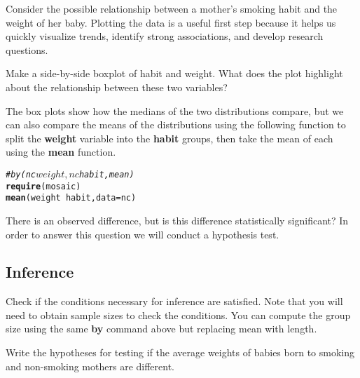 \documentclass{article}\usepackage[]{graphicx}\usepackage[]{color}
\makeatletter
\newcommand{\hlcom}[1]{\textcolor[rgb]{0.678,0.584,0.686}{\textit{#1}}}%
\newcommand{\hlopt}[1]{\textcolor[rgb]{0,0,0}{#1}}%
\newcommand{\hlstd}[1]{\textcolor[rgb]{0.345,0.345,0.345}{#1}}%
\newcommand{\hlkwc}[1]{\textcolor[rgb]{0.333,0.667,0.333}{#1}}%
\newcommand{\hlkwd}[1]{\textcolor[rgb]{0.737,0.353,0.396}{\textbf{#1}}}%
\newenvironment{kframe}{%
 \def\at@end@of@kframe{}%
 \ifinner\ifhmode%
  \def\at@end@of@kframe{\end{minipage}}%
  \begin{minipage}{\columnwidth}%
 \fi\fi%
 \def\FrameCommand##1{\hskip\@totalleftmargin \hskip-\fboxsep
 \colorbox{shadecolor}{##1}\hskip-\fboxsep
     \hskip-\linewidth \hskip-\@totalleftmargin \hskip\columnwidth}%
 \MakeFramed {\advance\hsize-\width
   \@totalleftmargin\z@ \linewidth\hsize
   \@setminipage}}%
 {\par\unskip\endMakeFramed%
 \at@end@of@kframe}
\newenvironment{knitrout}{}{} %
\makeatother
\begin{document}
Consider the possible relationship between a mother's smoking habit and the weight of her baby. Plotting the data is a useful first step because it helps us quickly visualize trends, identify strong associations, and develop research questions.

\begin{exercise}
Make a side-by-side boxplot of \hlstd{habit} and \hlstd{weight}. What does the plot highlight about the relationship between these two variables?
\end{exercise}

The box plots show how the medians of the two distributions compare, but we can also compare the means of the distributions using the following function to split the \hlkwd{weight} variable into the \hlkwd{habit} groups, then take the mean of each using the \hlkwd{mean} function.

\begin{knitrout}
\color{fgcolor}\begin{kframe}
\begin{alltt}
\hlcom{# by(nc$weight, nc$habit, mean)}
\hlkwd{require}\hlstd{(mosaic)}
\hlkwd{mean}\hlstd{(weight} \hlopt{~} \hlstd{habit,} \hlkwc{data} \hlstd{= nc)}
\end{alltt}
\end{kframe}
\end{knitrout}


There is an observed difference, but is this difference statistically significant? In order to answer this question we will conduct a hypothesis test.

\subsection*{Inference}

\begin{exercise}
Check if the conditions necessary for inference are satisfied. Note that you will need to obtain sample sizes to check the conditions. You can compute the group size using the same \hlkwd{by} command above but replacing \hlstd{mean} with \hlstd{length}.
\end{exercise}

\begin{exercise}
Write the hypotheses for testing if the average weights of babies born to smoking and non-smoking mothers are different.
\end{exercise}
\end{document}
